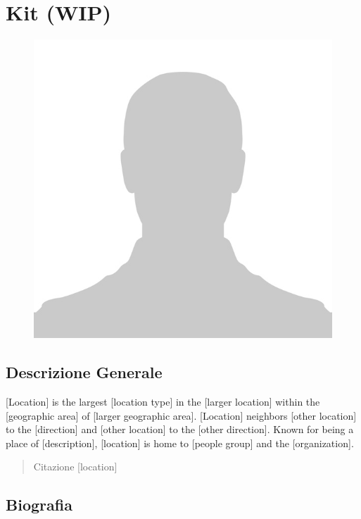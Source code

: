 \section{Kit (WIP)}\label{kit-wip}


\begin{figure}
\centering
\includegraphics{No-Photo-Available-591x591-2.jpg}
\end{figure}

\subsection{Descrizione Generale}\label{descrizione-generale}



{[}Location{]} is the largest {[}location type{]} in the {[}larger
location{]} within the {[}geographic area{]} of {[}larger geographic
area{]}. {[}Location{]} neighbors {[}other location{]} to the
{[}direction{]} and {[}other location{]} to the {[}other direction{]}.
Known for being a place of {[}description{]}, {[}location{]} is home to
{[}people group{]} and the {[}organization{]}.

\begin{quote}
Citazione {[}location{]}
\end{quote}

\subsection{Biografia}\label{biografia}


